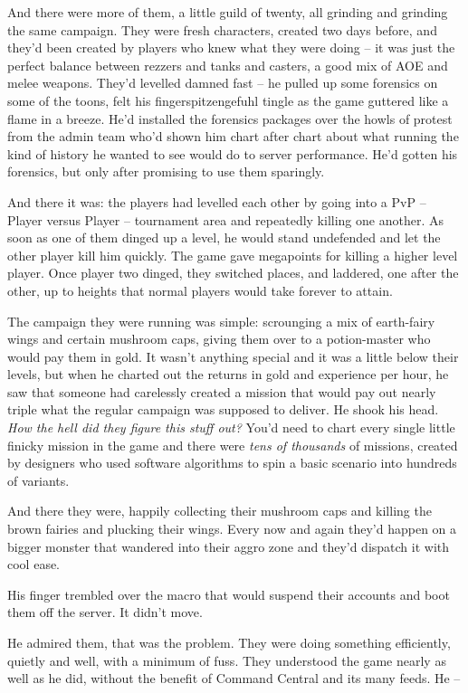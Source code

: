 And there were more of them, a little guild of twenty, all grinding
and grinding the same campaign. They were fresh characters, created
two days before, and they'd been created by players who knew what
they were doing -- it was just the perfect balance between rezzers
and tanks and casters, a good mix of AOE and melee weapons. They'd
levelled damned fast -- he pulled up some forensics on some of the
toons, felt his fingerspitzengefuhl tingle as the game guttered
like a flame in a breeze. He'd installed the forensics packages
over the howls of protest from the admin team who'd shown him chart
after chart about what running the kind of history he wanted to see
would do to server performance. He'd gotten his forensics, but only
after promising to use them sparingly.

And there it was: the players had levelled each other by going into
a PvP -- Player versus Player -- tournament area and repeatedly
killing one another. As soon as one of them dinged up a level, he
would stand undefended and let the other player kill him quickly.
The game gave megapoints for killing a higher level player. Once
player two dinged, they switched places, and laddered, one after
the other, up to heights that normal players would take forever to
attain.

The campaign they were running was simple: scrounging a mix of
earth-fairy wings and certain mushroom caps, giving them over to a
potion-master who would pay them in gold. It wasn't anything
special and it was a little below their levels, but when he charted
out the returns in gold and experience per hour, he saw that
someone had carelessly created a mission that would pay out nearly
triple what the regular campaign was supposed to deliver. He shook
his head. \emph{How the hell did they figure this stuff out?} You'd
need to chart every single little finicky mission in the game and
there were \emph{tens of thousands} of missions, created by
designers who used software algorithms to spin a basic scenario
into hundreds of variants.

And there they were, happily collecting their mushroom caps and
killing the brown fairies and plucking their wings. Every now and
again they'd happen on a bigger monster that wandered into their
aggro zone and they'd dispatch it with cool ease.

His finger trembled over the macro that would suspend their
accounts and boot them off the server. It didn't move.

He admired them, that was the problem. They were doing something
efficiently, quietly and well, with a minimum of fuss. They
understood the game nearly as well as he did, without the benefit
of Command Central and its many feeds. He --

